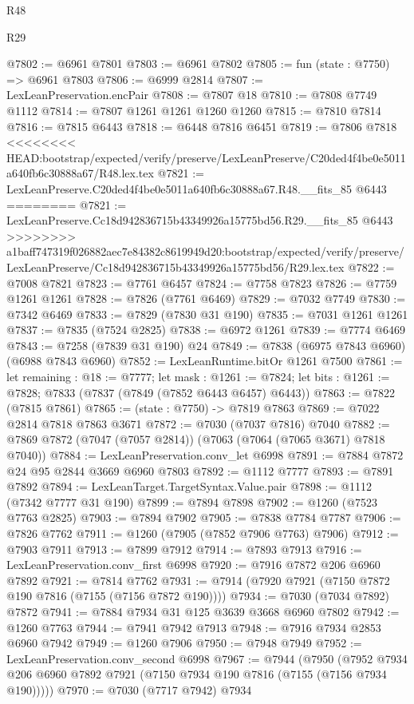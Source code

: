 \begin{lexlean}{R48}
\begin{lexlean}{R29}
\begin{coremodule}
{{{{{{{{{{{{{{{{{{{{{{{{{{{{{{{{{{{{{{{{{{{{{{{{{{{{{{{{{{{{{{{{{{{{{{{{{{{{{{{{{{{{{{{{{{{{{{{{{{{{{{{{{{{{{{{{{{{{{{{{{{{{{{{{{{{{{{{{{{{{{{{{{{{{{{{{{{{{{{{{{{{{{{{{{{{{{{{{{{{{{{{{{{{{{{{{{{{{{{{{{{{{{{{{{{{{{{{{{{@7802 := @6961 @7801
@7803 := @6961 @7802
@7805 := fun (state : @7750) => @6961 @7803
@7806 := @6999 @2814
@7807 := LexLeanPreservation.encPair
@7808 := @7807 @18
@7810 := @7808 @7749 @1112
@7814 := @7807 @1261 @1261 @1260 @1260
@7815 := @7810 @7814
@7816 := @7815 @6443
@7818 := @6448 @7816 @6451
@7819 := @7806 @7818
<<<<<<<< HEAD:bootstrap/expected/verify/preserve/LexLeanPreserve/C20ded4f4be0e5011a640fb6c30888a67/R48.lex.tex
@7821 := LexLeanPreserve.C20ded4f4be0e5011a640fb6c30888a67.R48.__fits_85 @6443
========
@7821 := LexLeanPreserve.Cc18d942836715b43349926a15775bd56.R29.__fits_85 @6443
>>>>>>>> a1baff747319f026882aec7e84382c8619949d20:bootstrap/expected/verify/preserve/LexLeanPreserve/Cc18d942836715b43349926a15775bd56/R29.lex.tex
@7822 := @7008 @7821
@7823 := @7761 @6457
@7824 := @7758 @7823
@7826 := @7759 @1261 @1261
@7828 := @7826 (@7761 @6469)
@7829 := @7032 @7749
@7830 := @7342 @6469
@7833 := @7829 (@7830 @31 @190)
@7835 := @7031 @1261 @1261
@7837 := @7835 (@7524 @2825)
@7838 := @6972 @1261
@7839 := @7774 @6469
@7843 := @7258 (@7839 @31 @190) @24
@7849 := @7838 (@6975 @7843 @6960) (@6988 @7843 @6960)
@7852 := LexLeanRuntime.bitOr @1261 @7500
@7861 := let remaining : @18 := @7777;
  let mask : @1261 := @7824;
  let bits : @1261 := @7828; @7833 (@7837 (@7849 (@7852 @6443 @6457) @6443))
@7863 := @7822 (@7815 @7861)
@7865 := (state : @7750) -> @7819 @7863
@7869 := @7022 @2814 @7818 @7863 @3671
@7872 := @7030 (@7037 @7816) @7040
@7882 := @7869 @7872 (@7047 (@7057 @2814)) (@7063 (@7064 (@7065 @3671) @7818 @7040))
@7884 := LexLeanPreservation.conv_let @6998
@7891 := @7884 @7872 @24 @95 @2844 @3669 @6960 @7803
@7892 := @1112 @7777
@7893 := @7891 @7892
@7894 := LexLeanTarget.TargetSyntax.Value.pair
@7898 := @1112 (@7342 @7777 @31 @190)
@7899 := @7894 @7898
@7902 := @1260 (@7523 @7763 @2825)
@7903 := @7894 @7902
@7905 := @7838 @7784 @7787
@7906 := @7826 @7762
@7911 := @1260 (@7905 (@7852 @7906 @7763) @7906)
@7912 := @7903 @7911
@7913 := @7899 @7912
@7914 := @7893 @7913
@7916 := LexLeanPreservation.conv_first @6998
@7920 := @7916 @7872 @206 @6960 @7892
@7921 := @7814 @7762
@7931 := @7914 (@7920 @7921 (@7150 @7872 @190 @7816 (@7155 (@7156 @7872 @190))))
@7934 := @7030 (@7034 @7892) @7872
@7941 := @7884 @7934 @31 @125 @3639 @3668 @6960 @7802
@7942 := @1260 @7763
@7944 := @7941 @7942 @7913
@7948 := @7916 @7934 @2853 @6960 @7942
@7949 := @1260 @7906
@7950 := @7948 @7949
@7952 := LexLeanPreservation.conv_second @6998
@7967 := @7944
    (@7950 (@7952 @7934 @206 @6960 @7892 @7921 (@7150 @7934 @190 @7816 (@7155 (@7156 @7934 @190)))))
@7970 := @7030 (@7717 @7942) @7934
}}}}}}}}}}}}}}}}}}}}}}}}}}}}}}}}}}}}}}}}}}}}}}}}}}}}}}}}}}}}}}}}}}}}}}}}}}}}}}}}}}}}}}}}}}}}}}}}}}}}}}}}}}}}}}}}}}}}}}}}}}}}}}}}}}}}}}}}}}}}}}}}}}}}}}}}}}}}}}}}}}}}}}}}}}}}}}}}}}}}}}}}}}}}}}}}}}}}}}}}}}}}}}}}}}}}}}}}}}
\end{coremodule}
\end{lexlean}
\end{lexlean}
